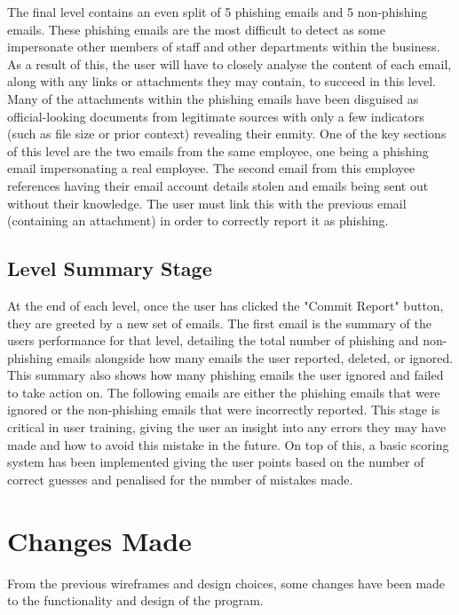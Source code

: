\documentclass{l4proj}
\begin{document}
The final level contains an even split of 5 phishing emails and 5 non-phishing emails. These phishing emails are the most difficult to detect as some impersonate other members of staff and other departments within the business. As a result of this, the user will have to closely analyse the content of each email, along with any links or attachments they may contain, to succeed in this level. Many of the attachments within the phishing emails have been disguised as official-looking documents from legitimate sources with only a few indicators (such as file size or prior context) revealing their enmity. One of the key sections of this level are the two emails from the same employee, one being a phishing email impersonating a real employee. The second email from this employee references having their email account details stolen and emails being sent out without their knowledge. The user must link this with the previous email (containing an attachment) in order to correctly report it as phishing.

\subsection{Level Summary Stage}
At the end of each level, once the user has clicked the "Commit Report" button, they are greeted by a new set of emails. The first email is the summary of the users performance for that level, detailing the total number of phishing and non-phishing emails alongside how many emails the user reported, deleted, or ignored. This summary also shows how many phishing emails the user ignored and failed to take action on. The following emails are either the phishing emails that were ignored or the non-phishing emails that were incorrectly reported. This stage is critical in user training, giving the user an insight into any errors they may have made and how to avoid this mistake in the future. On top of this, a basic scoring system has been implemented giving the user points based on the number of correct guesses and penalised for the number of mistakes made. 

\section{Changes Made}
From the previous wireframes and design choices, some changes have been made to the functionality and design of the program.
\end{document}
